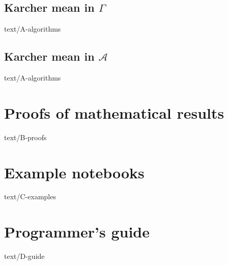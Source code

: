 \documentclass[epsbased,copyleft,final,loe, lof,extendedindex,firstnumbered,tfg,english]{tfgtfmthesisuam}
\begin{document}
  \section{Karcher mean in $\Gamma$\label{SEC:KARCHERG}}{text/A-algorithms}
  \section{Karcher mean in $\mathscr{A}$\label{SEC:KARCHERA}}{text/A-algorithms}

\chapter{Proofs of mathematical results\label{CAP:PROOFS}}{text/B-proofs}



\chapter{Example notebooks\label{CAP:EXAMPLES}}{text/C-examples}
\chapter{Programmer’s guide\label{CAP:GUIDE}}{text/D-guide}
\end{document}
